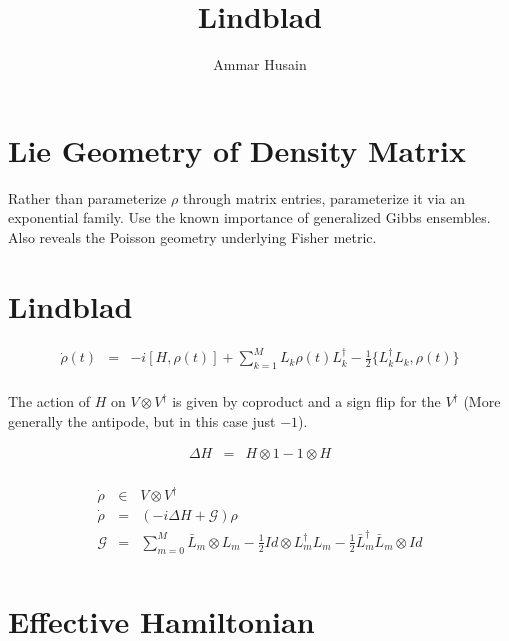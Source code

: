 \documentclass[11pt]{article}
\title{Lindblad}
\author{Ammar Husain}
\theoremstyle{change}
\theoremstyle{nonumberplain}
\numberwithin{equation}{section}
\newcommand\setof[1]{\{ #1 \}}
\begin{document}
\maketitle

\section{Lie Geometry of Density Matrix}

Rather than parameterize $\rho$ through matrix entries, parameterize it via an exponential family. Use the known importance of generalized Gibbs ensembles. Also reveals the Poisson geometry underlying Fisher metric.

\section{Lindblad}

\begin{eqnarray*}
\dot{\rho} (t) &=& - i [ H , \rho (t) ] + \sum_{k=1}^M L_k \rho (t) L_k^\dagger - \frac{1}{2} \setof{ L_k^\dagger L_k , \rho (t) }\\
\end{eqnarray*}

The action of $H$ on $V \otimes V^\dagger$ is given by coproduct and a sign flip for the $V^\dagger$ (More generally the antipode, but in this case just $-1$).

\begin{eqnarray*}
\Delta H &=& H \otimes 1 - 1 \otimes H\\
\end{eqnarray*}

\begin{eqnarray*}
\dot{\rho} &\in& V \otimes V^\dagger\\
\dot{\rho} &=& (-i \Delta H + \mathcal{G} ) \rho\\
\mathcal{G} &=& \sum_{m=0}^M \bar{L}_m \otimes L_m - \frac{1}{2} Id \otimes L_m^\dagger L_m - \frac{1}{2} \bar{L}_m^\dagger \bar{L}_m \otimes Id\\
\end{eqnarray*}

\section{Effective Hamiltonian}
\end{document}

